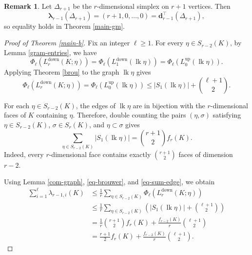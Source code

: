 \documentclass[12pt]{amsart}
\theoremstyle{plain}
\theoremstyle{definition}
\newtheorem{rmk}[thm]{Remark}
\numberwithin{equation}{section}
\numberwithin{figure}{section}
\newcommand{\bflam}{\bm{\lambda}}
\newcommand{\dd}{\mathbf d}
\newcommand{\Ldown}{L^{\operatorname{down}}}
\newcommand{\Lup}{L^{\operatorname{up}}}
\newcommand{\lk}{\operatorname{lk}}
\begin{document}
\begin{rmk}
Let $\Delta_{r+1}$ be the $r$-dimensional simplex on $r+1$ vertices.
Then
\[
\bflam_{r-1}(\Delta_{r+1})
=
(r+1,0,\ldots,0)
=
\dd_{r-1}^\top(\Delta_{r+1}),
\]
so equality holds in Theorem \ref{main-gm}.
\end{rmk}

\begin{proof}[Proof of Theorem \ref{main-b}]
Fix an integer $\ell \geq 1$.
For every $\eta \in S_{r - 2}(K)$, by Lemma \ref{gram-entries}, we have 
$$\Phi_\ell(\Ldown_r(K;\eta)) = \Phi_\ell(\Ldown_1(\lk \eta))= \Phi_\ell(\Lup_0(\lk \eta)).$$
Applying Theorem \ref{brou} to the graph $\lk \eta$ gives
\begin{equation}\label{eq-brouwer}
\Phi_\ell(\Ldown_r(K;\eta))=\Phi_\ell(\Lup_0(\lk \eta))
\leq
|S_1(\lk \eta)|
+
\binom{\ell + 1}{2}.
\end{equation}

For each $\eta \in S_{r - 2}(K)$, the edges of $\lk \eta$ are in bijection with the $r$-dimensional faces of $K$ containing $\eta$.
Therefore, double counting the pairs $(\eta,\sigma)$ satisfying $\eta \in S_{r - 2}(K)$, $\sigma \in S_r(K)$, and $\eta \subset \sigma$ gives
\begin{equation}\label{eq-sum-edge}
\sum_{\eta \in S_{r - 2}(K)}
|S_1(\lk \eta)|
=
\binom{r + 1}{2} f_r(K).
\end{equation}
Indeed, every $r$-dimensional face contains exactly $\binom{r + 1}{2}$ faces of dimension $r - 2$.

Using Lemma \ref{com-graph}, \eqref{eq-brouwer}, and \eqref{eq-sum-edge}, we obtain
\[
\begin{aligned}
\sum_{i = 1}^{\ell} \lambda_{r-1,i}(K)
&\leq
\frac{1}{r}
\sum_{\eta \in S_{r - 2}(K)}
\Phi_\ell(\Ldown_r(K;\eta)) \\
&\leq
\frac{1}{r}
\sum_{\eta \in S_{r - 2}(K)}
\left(
|S_1(\lk \eta)|
+
\binom{\ell + 1}{2}
\right) \\
&=
\frac{1}{r}
\binom{r + 1}{2} f_r(K)
+
\frac{f_{r - 2}(K)}{r}
\binom{\ell + 1}{2} \\
&=
\frac{r + 1}{2} f_r(K)
+
\frac{f_{r - 2}(K)}{r}
\binom{\ell + 1}{2}.
\end{aligned}
\]
\end{proof}
\end{document}
